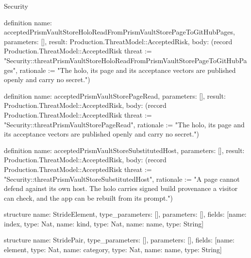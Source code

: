\begin{lexlean}{Security}
\begin{semanticmodule}
definition{
  name: acceptedPrismVaultStoreHoloReadFromPrismVaultStorePageToGitHubPages,
  parameters: [],
  result: Production.ThreatModel::AcceptedRisk,
  body: (record Production.ThreatModel::AcceptedRisk {threat := "Security::threatPrismVaultStoreHoloReadFromPrismVaultStorePageToGitHubPages", rationale := "The holo, its page and its acceptance vectors are published openly and carry no secret."})
}

definition{
  name: acceptedPrismVaultStorePageRead,
  parameters: [],
  result: Production.ThreatModel::AcceptedRisk,
  body: (record Production.ThreatModel::AcceptedRisk {threat := "Security::threatPrismVaultStorePageRead", rationale := "The holo, its page and its acceptance vectors are published openly and carry no secret."})
}

definition{
  name: acceptedPrismVaultStoreSubstitutedHost,
  parameters: [],
  result: Production.ThreatModel::AcceptedRisk,
  body: (record Production.ThreatModel::AcceptedRisk {threat := "Security::threatPrismVaultStoreSubstitutedHost", rationale := "A page cannot defend against its own host. The holo carries signed build provenance a visitor can check, and the app can be rebuilt from its prompt."})
}

structure{
  name: StrideElement,
  type_parameters: [],
  parameters: [],
  fields: [{name: index, type: Nat}, {name: kind, type: Nat}, {name: name, type: String}]
}

structure{
  name: StridePair,
  type_parameters: [],
  parameters: [],
  fields: [{name: element, type: Nat}, {name: category, type: Nat}, {name: name, type: String}]
}


\end{semanticmodule}
\end{lexlean}
